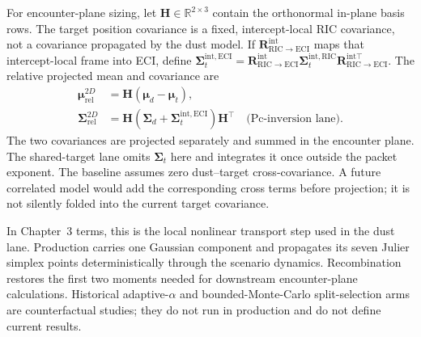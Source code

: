    For encounter-plane sizing, let \(\mathbf{H}\in\mathbb{R}^{2\times3}\) contain the
    orthonormal in-plane basis rows. The target position covariance is a fixed,
    intercept-local RIC covariance, not a covariance propagated by the dust model.
    If \(\mathbf{R}_{\mathrm{RIC}\rightarrow\mathrm{ECI}}^{\mathrm{int}}\) maps that
    intercept-local frame into ECI, define
    \(\boldsymbol{\Sigma}_{t}^{\mathrm{int,ECI}}=\mathbf{R}_{\mathrm{RIC}\rightarrow\mathrm{ECI}}^{\mathrm{int}}
    \boldsymbol{\Sigma}_{t}^{\mathrm{int,RIC}}\mathbf{R}_{\mathrm{RIC}\rightarrow\mathrm{ECI}}^{\mathrm{int}\top}\).
    The relative projected mean and covariance are
    \begin{align}
        \boldsymbol{\mu}_{\mathrm{rel}}^{2D} &= \mathbf{H}(\boldsymbol{\mu}_{d}-\boldsymbol{\mu}_{t}),\\
        \boldsymbol{\Sigma}_{\mathrm{rel}}^{2D} &= \mathbf{H}\left(\boldsymbol{\Sigma}_{d}+\boldsymbol{\Sigma}_{t}^{\mathrm{int,ECI}}\right)\mathbf{H}^{\top}\quad\text{(Pc-inversion lane)}.
    \end{align}
    The two covariances are projected separately and summed in the encounter plane. The shared-target lane omits \(\boldsymbol{\Sigma}_{t}\) here and integrates it once outside the packet exponent. The baseline assumes zero dust--target cross-covariance. A future correlated model
    would add the corresponding cross terms before projection; it is not silently folded
    into the current target covariance.

In Chapter~3 terms, this is the local nonlinear transport step used in the dust lane. Production carries one Gaussian component and propagates its seven Julier simplex points deterministically through the scenario dynamics. Recombination restores the first two moments needed for downstream encounter-plane calculations. Historical adaptive-\(\alpha\) and bounded-Monte-Carlo split-selection arms are counterfactual studies; they do not run in production and do not define current results.

